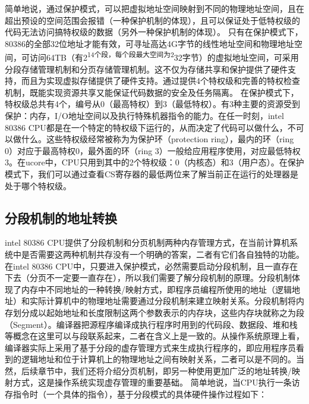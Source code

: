 简单地说，通过保护模式，可以把虚拟地址空间映射到不同的物理地址空间，且在超出预设的空间范围会报错（一种保护机制的体现），且可以保证处于低特权级的代码无法访问搞特权级的数据（另外一种保护机制的体现）。
只有在保护模式下，80386的全部32位地址才能有效，可寻址高达4G字节的线性地址空间和物理地址空间，可访问64TB（有2\textsuperscript{14个段，每个段最大空间为2}32字节）的虚拟地址空间，可采用分段存储管理机制和分页存储管理机制。这不仅为存储共享和保护提供了硬件支持，而且为实现虚拟存储提供了硬件支持。通过提供4个特权级和完善的特权检查机制，既能实现资源共享又能保证代码数据的安全及任务隔离。
在保护模式下，特权级总共有4个，编号从0（最高特权）到3（最低特权）。有3种主要的资源受到保护：内存，I/O地址空间以及执行特殊机器指令的能力。在任一时刻，intel
80386
CPU都是在一个特定的特权级下运行的，从而决定了代码可以做什么，不可以做什么。这些特权级经常被称为为保护环（protection
ring），最内的环（ring 0）对应于最高特权0，最外面的环（ring
3）一般给应用程序使用，对应最低特权3。在ucore中，CPU只用到其中的2个特权级：0（内核态）和3（用户态）。在保护模式下，我们可以通过查看CS寄存器的最低两位来了解当前正在运行的处理器是处于哪个特权级。

\subsection{分段机制的地址转换}\label{ux5206ux6bb5ux673aux5236ux7684ux5730ux5740ux8f6cux6362}

intel 80386
CPU提供了分段机制和分页机制两种内存管理方式，在当前计算机系统中是否需要这两种机制共存没有一个明确的答案，二者有它们各自独特的功能。在intel
80386
CPU中，只要进入保护模式，必然需要启动分段机制，且一直存在下去（分页不一定要一直存在），所以我们需要了解分段机制的原理。分段机制体现了内存中不同地址的一种转换/映射方式，即程序员编程所使用的地址（逻辑地址）和实际计算机中的物理地址需要通过分段机制来建立映射关系。分段机制将内存划分成以起始地址和长度限制这两个参数表示的内存块，这些内存块就称之为段（Segment）。编译器把源程序编译成执行程序时用到的代码段、数据段、堆和栈等概念在这里可以与段联系起来，二者在含义上是一致的。从操作系统原理上看，编译器实际上采用了基于分段的虚存管理方式来生成执行程序的，即应用程序员看到的逻辑地址和位于计算机上的物理地址之间有映射关系，二者可以是不同的。当然，后续章节中，我们还将介绍分页机制，即另一种使用更加广泛的地址转换/映射方式，这是操作系统实现虚存管理的重要基础。
简单地说，当CPU执行一条访存指令时（一个具体的指令），基于分段模式的具体硬件操作过程如下：

